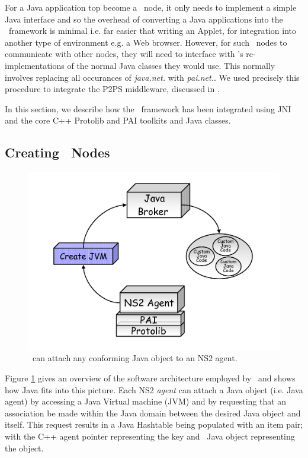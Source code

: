 For a Java application top become a \agentj~node, it only needs to 
implement a simple Java interface and so the overhead of converting a
Java applications into the \agentj~framework is minimal i.e. far easier 
that writing an Applet, for integration into another type of environment 
e.g. a Web browser.  However, for such \agentj~nodes to 
communicate with other nodes, they will need to interface with 
\agentj's re-implementations of the normal Java classes they would 
use. This normally involves replacing all occurances of 
\emph{java.net.} with \emph{pai.net.}.  We used precisely this procedure 
to integrate the  P2PS middleware, discussed in \cite{p2psx}.  


In this section, we describe how the \agentj~framework 
has been integrated using JNI and the core C++ Protolib and PAI 
toolkits and Java classes. 


\subsection{Creating \agentj~Nodes}
\label{agentj:creating}

\begin{figure}
\centering
\includegraphics[scale=0.3]{images/agentjOverview}
\caption{\agentj~can attach any conforming Java object to an NS2 agent.} 
\label{agentj:fig:javaOverview}
\end{figure}

Figure \ref{agentj:fig:javaOverview} gives an overview of the software
architecture employed by \agentj~and shows how Java fits into
this picture.  Each NS2 \emph{agent} can attach a Java 
object (i.e. Java agent) by accessing a Java Virtual machine (JVM) 
and by requesting that an association be made within the Java domain
between the desired Java object and itself.  This request 
results in a Java Hashtable being populated with an item pair; with the 
C++ agent pointer representing the key and \agentj~Java object 
representing the object.   

